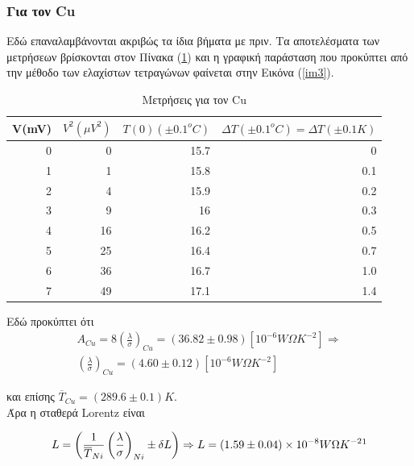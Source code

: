 \documentclass[a4paper]{article}
\begin{document}
		\subsubsection*{Για τον Cu}
			Εδώ επαναλαμβάνονται ακριβώς τα ίδια βήματα με πριν. Τα αποτελέσματα των μετρήσεων βρίσκονται στον Πίνακα (\ref{mat2}) και η 		γραφική παράσταση που προκύπτει από την μέθοδο των ελαχίστων τετραγώνων φαίνεται στην Εικόνα (\ref{im3}). 
			
			\begin{table}[h!]
				\centering
				\begin{tabular}{r|r|r|r}			
					V(mV) & $V^2(\mu V^2)$ & $Τ(0) (\pm0.1^oC)$ & $\Delta T(\pm0.1^oC)=\Delta T(\pm0.1K)$ \\\hline\hline
					0&0&15.7&0\\
					1&1&15.8&0.1\\
					2&4&15.9&0.2\\
					3&9&16&0.3\\
					4&16&16.2&0.5\\
					5&25&16.4&0.7\\
					6&36&16.7&1.0\\
					7&49&17.1&1.4
				\end{tabular}
				\caption{Μετρήσεις για τον Cu}
				\label{mat2}
			\end{table}
			
			Εδώ προκύπτει ότι  
				\begin{align*}
					A_{Cu} = 8\left(\frac{\lambda}{\sigma}\right)_{Cu} = (36.82 \pm 0.98) [10^{-6}W\Omega K^{-2}] \Rightarrow \\ 
					\left(\frac{\lambda}{\sigma}\right)_{Cu} = ( 4.60 \pm 0.12) [10^{-6}W\Omega K^{-2}]
				\end{align*}
				
				και επίσης $\overline{T}_{Cu} = (289.6 \pm0.1)K$. \\
				
				Άρα η σταθερά Lorentz είναι 	
					
		\begin{align*}
			L = \left( \frac{1}{\overline{T}_{Ni}}\left(\frac{\lambda}{\sigma}\right)_{Ni} \pm \delta L\right) \Rightarrow 
			  L = ( 1.59\pm0.04 )\times10^{-8}W\Omega K^{-2} \footnotemark  
		\end{align*}
				
\end{document}
